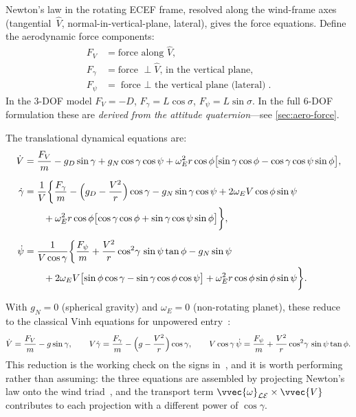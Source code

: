Newton's law in the rotating ECEF frame, resolved along the wind-frame
axes (tangential~$\hat{V}$, normal-in-vertical-plane, lateral), gives
the force equations. Define the aerodynamic force components:
\begin{align*}
  F_V     &= \text{force along } \hat{V},\\
  F_\gamma &= \text{force $\perp\hat{V}$, in the vertical plane},\\
  F_\psi  &= \text{force $\perp$ the vertical plane (lateral)}.
\end{align*}
In the 3-DOF model $F_V=-D$, $F_\gamma=L\cos\sigma$,
$F_\psi=L\sin\sigma$. In the full 6-DOF formulation these are
\emph{derived from the attitude quaternion}---see
\cref{sec:aero-force}.

The translational dynamical equations are:
\begin{align}
  \dot V &= \frac{F_V}{m}
    - g_D\sin\gamma + g_N\cos\gamma\cos\psi
    + \omega_E^2 r\cos\phi
      \bigl[\sin\gamma\cos\phi - \cos\gamma\cos\psi\sin\phi\bigr],
    \label{eq:Vdot}
  \\[6pt]
  \dot\gamma &= \frac{1}{V}\biggl\{
    \frac{F_\gamma}{m}
    - \Bigl(g_D - \frac{V^2}{r}\Bigr)\cos\gamma
    - g_N\sin\gamma\cos\psi
    + 2\omega_E V\cos\phi\sin\psi \nonumber\\
    &\qquad{}+ \omega_E^2 r\cos\phi
      \bigl[\cos\gamma\cos\phi + \sin\gamma\cos\psi\sin\phi\bigr]
    \biggr\}, \label{eq:gamdot}
  \\[6pt]
  \dot\psi &= \frac{1}{V\cos\gamma}\biggl\{
    \frac{F_\psi}{m}
    + \frac{V^2}{r}\cos^2\!\gamma\,\sin\psi\tan\phi
    - g_N\sin\psi \nonumber\\
    &\qquad{}+ 2\omega_E V
      \bigl[\sin\phi\cos\gamma - \sin\gamma\cos\phi\cos\psi\bigr]
    + \omega_E^2 r\cos\phi\sin\phi\sin\psi
    \biggr\}. \label{eq:psidot}
\end{align}

\begin{remark}\label{rem:vinh-reduction}
With $g_N = 0$ (spherical gravity) and
$\omega_E = 0$ (non-rotating planet), these reduce to the classical Vinh
equations for unpowered entry~\cite{vinh1980hypersonic}:
\[
  \dot V = \frac{F_V}{m} - g\sin\gamma,\qquad
  V\dot\gamma = \frac{F_\gamma}{m} - \Bigl(g-\frac{V^2}{r}\Bigr)\cos\gamma,
  \qquad
  V\cos\gamma\,\dot\psi = \frac{F_\psi}{m}
    + \frac{V^2}{r}\cos^2\!\gamma\,\sin\psi\tan\phi .
\]
This reduction is the working check on the signs
in~, and it is worth performing rather than
assuming: the three equations are assembled by projecting Newton's law onto
the wind triad~, and the transport term
$\vvec{\omega}_{\mathcal{L}\mathcal{E}}\times\vvec{V}$ contributes to each
projection with a different power of $\cos\gamma$.
\end{remark}

